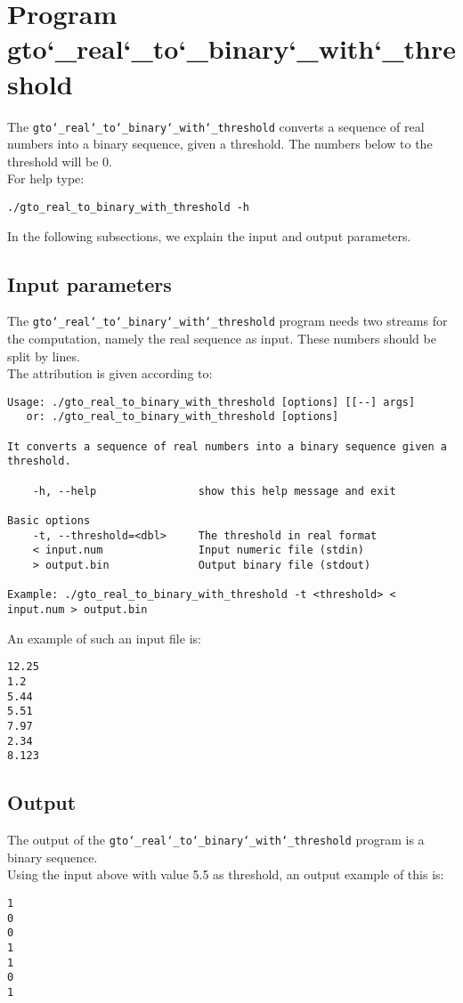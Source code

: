 \section{Program gto\char`_real\char`_to\char`_binary\char`_with\char`_threshold}
The \texttt{gto\char`_real\char`_to\char`_binary\char`_with\char`_threshold} converts a sequence of real numbers into a binary sequence, given a threshold. The numbers below to the threshold will be 0.\\
For help type:
\begin{lstlisting}
./gto_real_to_binary_with_threshold -h
\end{lstlisting}
In the following subsections, we explain the input and output parameters.

\subsection*{Input parameters}

The \texttt{gto\char`_real\char`_to\char`_binary\char`_with\char`_threshold} program needs two streams for the computation, namely the real sequence as input. These numbers should be split by lines.\\

The attribution is given according to:
\begin{lstlisting}
Usage: ./gto_real_to_binary_with_threshold [options] [[--] args]
   or: ./gto_real_to_binary_with_threshold [options]

It converts a sequence of real numbers into a binary sequence given a threshold.

    -h, --help                show this help message and exit

Basic options
    -t, --threshold=<dbl>     The threshold in real format
    < input.num               Input numeric file (stdin)
    > output.bin              Output binary file (stdout)

Example: ./gto_real_to_binary_with_threshold -t <threshold> < input.num > output.bin
\end{lstlisting}
An example of such an input file is:
\begin{lstlisting}
12.25
1.2
5.44
5.51
7.97
2.34
8.123
\end{lstlisting}

\subsection*{Output}
The output of the \texttt{gto\char`_real\char`_to\char`_binary\char`_with\char`_threshold} program is a binary sequence.\\
Using the input above with value 5.5 as threshold, an output example of this is:
\begin{lstlisting}
1
0
0
1
1
0
1
\end{lstlisting}